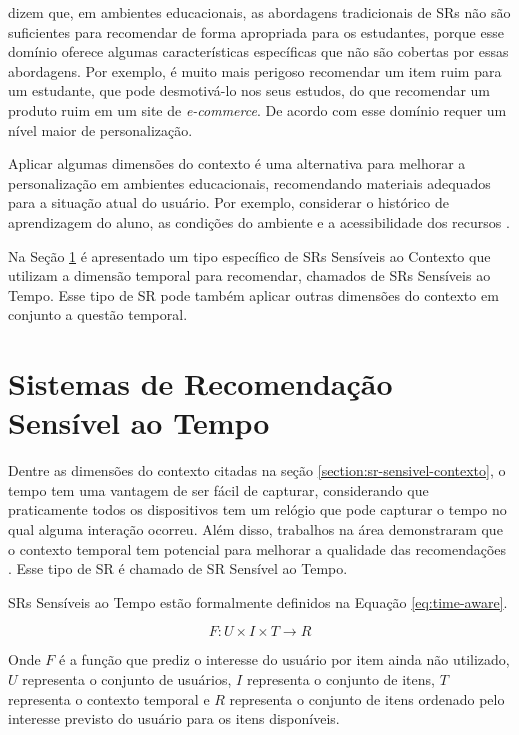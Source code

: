 dizem que, em ambientes educacionais, as abordagens tradicionais de SRs não são
suficientes para recomendar de forma apropriada para os estudantes, porque esse domínio oferece algumas características
específicas que não são cobertas por essas abordagens. Por exemplo, é muito mais perigoso recomendar um item ruim para
um estudante, que pode desmotivá-lo nos seus estudos, do que recomendar um produto ruim em um site de \textit{e-commerce}.
De acordo com  esse domínio requer um nível maior de personalização.

Aplicar algumas dimensões do contexto é uma alternativa para melhorar a personalização em ambientes educacionais,
recomendando materiais adequados para a situação atual do usuário. Por exemplo, considerar o histórico de aprendizagem
do aluno, as condições do ambiente e a acessibilidade dos recursos \cite{verbert2012context}.

Na Seção \ref{section:sr-sensivel-tempo} é apresentado um tipo específico de SRs Sensíveis ao Contexto que utilizam a dimensão temporal para
recomendar, chamados de SRs Sensíveis ao Tempo. Esse tipo de SR pode também aplicar outras dimensões do contexto em
conjunto a questão temporal.

\section{Sistemas de Recomendação Sensível ao Tempo}\label{section:sr-sensivel-tempo}

Dentre as dimensões do contexto citadas na seção \ref{section:sr-sensivel-contexto}, o tempo tem uma vantagem de ser
fácil de capturar, considerando que praticamente todos os dispositivos tem um relógio que pode capturar o tempo no qual
alguma interação ocorreu. Além disso, trabalhos na área demonstraram que o contexto temporal tem potencial para melhorar
a qualidade das recomendações \cite{campos2014time}. Esse tipo de SR é chamado de SR Sensível ao Tempo.

SRs Sensíveis ao Tempo estão formalmente definidos na Equação \ref{eq:time-aware}.

\begin{equation}
  F: U \times I \times T \rightarrow R
  \label{eq:time-aware}
\end{equation}

Onde $F$ é a função que prediz o interesse do usuário por item ainda não utilizado, $U$ representa o conjunto de usuários,
$I$ representa o conjunto de itens, $T$ representa o contexto temporal e $R$ representa o conjunto de itens ordenado pelo
interesse previsto do usuário para os itens disponíveis.

